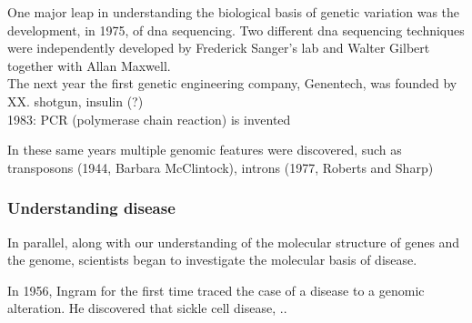 

One major leap in understanding the biological basis of genetic variation was the development, in 1975, of \gls{dna} sequencing. 
Two different \gls{dna} sequencing techniques were independently developed by Frederick Sanger's lab and Walter Gilbert together with Allan Maxwell.\\


The next year the first genetic engineering company, Genentech, was founded by XX. shotgun, insulin (?)\\


1983: PCR (polymerase chain reaction) is invented 


In these same years multiple genomic features were discovered, such as transposons (1944, Barbara McClintock), introns (1977, Roberts and Sharp)


\subsubsection{Understanding disease}

In parallel, along with our understanding of the molecular structure of genes and the genome, scientists began to investigate the molecular basis of disease.



In 1956, Ingram for the first time traced the case of a disease to a genomic alteration.
He discovered that sickle cell disease, ..


